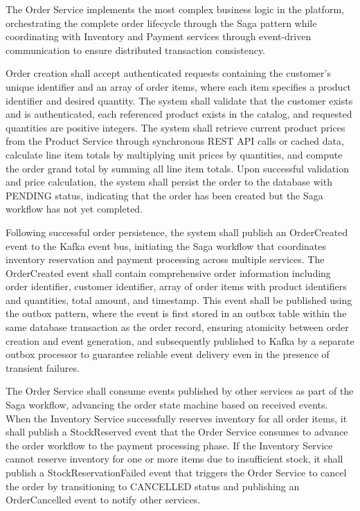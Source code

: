 The Order Service implements the most complex business logic in the platform, orchestrating the complete order lifecycle through the Saga pattern while coordinating with Inventory and Payment services through event-driven communication to ensure distributed transaction consistency.

Order creation shall accept authenticated requests containing the customer's unique identifier and an array of order items, where each item specifies a product identifier and desired quantity. The system shall validate that the customer exists and is authenticated, each referenced product exists in the catalog, and requested quantities are positive integers. The system shall retrieve current product prices from the Product Service through synchronous REST API calls or cached data, calculate line item totals by multiplying unit prices by quantities, and compute the order grand total by summing all line item totals. Upon successful validation and price calculation, the system shall persist the order to the database with PENDING status, indicating that the order has been created but the Saga workflow has not yet completed.

Following successful order persistence, the system shall publish an OrderCreated event to the Kafka event bus, initiating the Saga workflow that coordinates inventory reservation and payment processing across multiple services. The OrderCreated event shall contain comprehensive order information including order identifier, customer identifier, array of order items with product identifiers and quantities, total amount, and timestamp. This event shall be published using the outbox pattern, where the event is first stored in an outbox table within the same database transaction as the order record, ensuring atomicity between order creation and event generation, and subsequently published to Kafka by a separate outbox processor to guarantee reliable event delivery even in the presence of transient failures.

The Order Service shall consume events published by other services as part of the Saga workflow, advancing the order state machine based on received events. When the Inventory Service successfully reserves inventory for all order items, it shall publish a StockReserved event that the Order Service consumes to advance the order workflow to the payment processing phase. If the Inventory Service cannot reserve inventory for one or more items due to insufficient stock, it shall publish a StockReservationFailed event that triggers the Order Service to cancel the order by transitioning to CANCELLED status and publishing an OrderCancelled event to notify other services.

